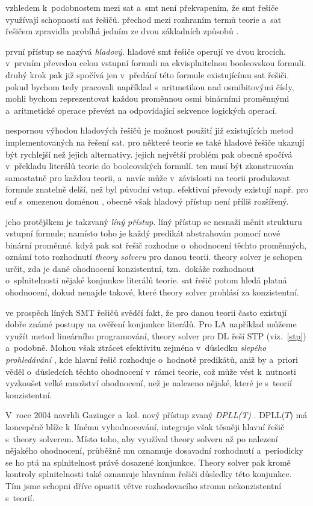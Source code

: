 vzhledem k~podobnostem mezi sat a~smt není překvapením, že smt řešiče využívají schopností sat řešičů. přechod mezi rozhraním termů teorie a~sat řešičem zpravidla probíhá jedním ze dvou základních způsobů \cite{Nieuwenhuis05}.

první přístup se nazývá \emph{hladový}. hladové smt řešiče operují ve dvou krocích. v~prvním převedou celou vstupní formuli na ekvisplnitelnou booleovskou formuli. druhý krok pak již spočívá jen v~předání této formule existujícímu sat řešiči. pokud bychom tedy pracovali například s~aritmetikou nad osmibitovými čísly, mohli bychom reprezentovat každou proměnnou osmi binárními proměnnými a~aritmetické operace převézt na odpovídající sekvence logických operací.

nespornou výhodou hladových řešičů je možnost použití již existujících metod implementovaných na řešení sat. pro některé teorie se také hladové řešiče ukazují být rychlejší než jejich alternativy. jejich největší problém pak obecně spočívá v~překladu literálů teorie do booleovských formulí. ten musí být zkonstruován samostatně pro každou teorii, a~navíc může v~závislosti na teorii produkovat formule znatelně delší, než byl původní vstup. efektivní převody existují např. pro euf s~omezenou doménou \cite{randal02}, obecně však hladový přístup není příliš rozšířený.

jeho protějškem je takzvaný \emph{líný přístup}. líný přístup se nesnaží měnit strukturu vstupní formule; namísto toho je každý predikát abstrahován pomocí nové binární proměnné. když pak sat řešič rozhodne o~ohodnocení těchto proměnných, oznámí toto rozhodnutí \emph{theory solveru} pro danou teorii. theory solver je schopen určit, zda je dané ohodnocení konzistentní, tzn.~dokáže rozhodnout o~splnitelnosti nějaké konjunkce literálů teorie. sat řešič potom hledá platná ohodnocení, dokud nenajde takové, které theory solver prohlásí za konzistentní.

ve prospěch líných SMT řešičů svědčí fakt, že pro danou teorii často existují dobře známé postupy na ověření konjunkce literálů. Pro LA například můžeme využít metod lineárního programování, theory solver pro DL řeší STP (viz.~\ref{stp}) a~podobně. Mohou však ztrácet efektivitu zejména v~důsledku \emph{slepého prohledávání} \cite{Moura04}, kde hlavní řešič rozhoduje o~hodnotě predikátů, aniž by a~priori věděl o~důsledcích těchto ohodnocení v~rámci teorie, což může vést k~nutnosti vyzkoušet velké množství ohodnocení, než je nalezeno nějaké, které je s~teorií konzistentní.

V~roce 2004 navrhli Gazinger a~kol. nový přístup zvaný \emph{DPLL(T)} \cite{Gazinger04}. DPLL($T$) má koncepčně blíže k~línému vyhodnocování, integruje však těsněji hlavní řešič s~theory solverem. Místo toho, aby využíval theory solveru až po nalezení nějakého ohodnocení, průběžně mu oznamuje dosavadní rozhodnutí a~periodicky se ho ptá na splnitelnost právě dosazené konjunkce. Theory solver pak kromě kontroly splnitelnosti také oznamuje hlavnímu řešiči důsledky této konjunkce. Tím jsme schopni dříve opustit větve rozhodovacího stromu nekonzistentní s~teorií. 

